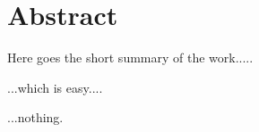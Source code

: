 %
%
%



\chapter*{Abstract}
\begin{SingleSpace}
Here goes the short summary of the work.....

\vspace{50mm}
\hspace{60mm} ...which is easy....

\vspace{50mm}
\hspace{120mm} ...nothing.
\end{SingleSpace}
\clearpage